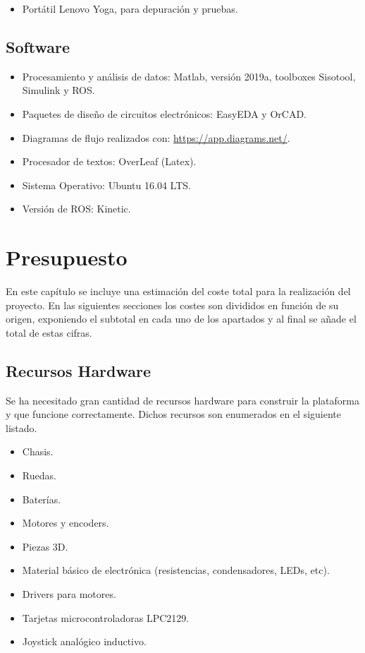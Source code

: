 \begin{itemize}
    \item Portátil Lenovo Yoga, para depuración y pruebas.
\end{itemize}

\section{Software}

\begin{itemize}
    \item Procesamiento y análisis de datos: Matlab, versión 2019a, toolboxes Sisotool, Simulink y ROS.
    \item  Paquetes de diseño de circuitos electrónicos: EasyEDA y OrCAD.
    \item Diagramas de flujo realizados con: \href{https://app.diagrams.net/}{https://app.diagrams.net/}.
    \item Procesador de textos: OverLeaf (Latex).
    \item Sistema Operativo: Ubuntu 16.04 LTS.
    \item Versión de ROS: Kinetic.
\end{itemize}

\chapter{Presupuesto}
\label{cha:presupuesto}

En este capítulo se incluye una estimación del coste total para la realización del proyecto. En las siguientes secciones los costes son divididos en función de su origen, exponiendo el subtotal en cada uno de los apartados y al final se añade el total de estas cifras.

\section{Recursos Hardware}
\label{sec:presupuesto-hardware}

Se ha necesitado gran cantidad de recursos hardware para construir la plataforma y que funcione correctamente. Dichos recursos son enumerados en el siguiente listado.

\begin{itemize}
    \item Chasis.
    \item Ruedas.
    \item Baterías.
    \item Motores y encoders.
    \item Piezas 3D.
    \item Material básico de electrónica (resistencias, condensadores, LEDs, etc).
    \item Drivers para motores.
    \item Tarjetas microcontroladoras LPC2129.
    \item Joystick analógico inductivo.
\end{itemize}

